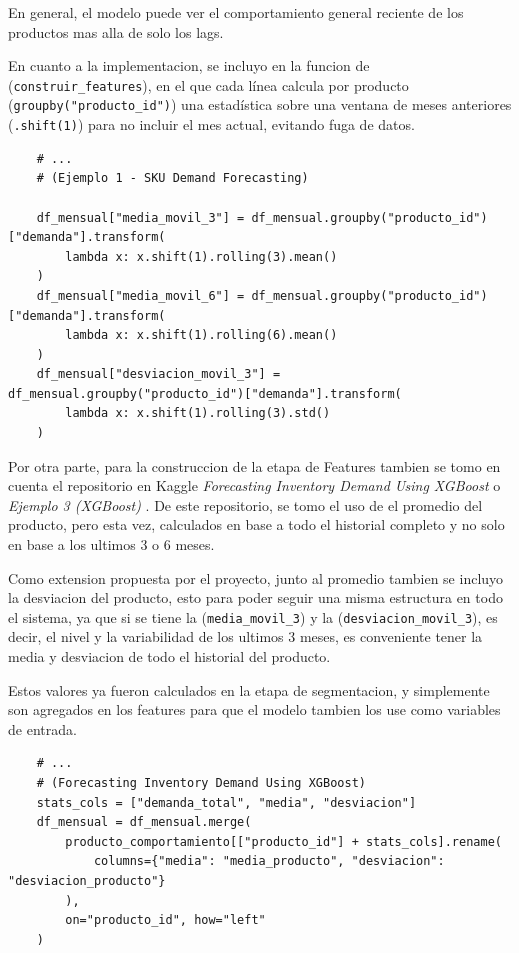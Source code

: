 En general, el modelo puede ver el comportamiento general reciente de los productos mas alla de solo los lags.

En cuanto a la implementacion, se incluyo en la funcion de (\texttt{construir\_features}), en el que cada línea calcula por producto (\texttt{groupby("producto\_id")}) una estadística sobre una ventana de meses anteriores (\texttt{.shift(1)}) para no incluir el mes actual, evitando fuga de datos.


\begin{verbatim}
    # ...
    # (Ejemplo 1 - SKU Demand Forecasting)

    df_mensual["media_movil_3"] = df_mensual.groupby("producto_id")["demanda"].transform(
        lambda x: x.shift(1).rolling(3).mean()
    )
    df_mensual["media_movil_6"] = df_mensual.groupby("producto_id")["demanda"].transform(
        lambda x: x.shift(1).rolling(6).mean()
    )
    df_mensual["desviacion_movil_3"] = df_mensual.groupby("producto_id")["demanda"].transform(
        lambda x: x.shift(1).rolling(3).std()
    )
\end{verbatim}

Por otra parte, para la construccion de la etapa de Features tambien se tomo en cuenta el repositorio en Kaggle \textit{Forecasting Inventory Demand Using XGBoost} \cite{ejemplo3_ksmooi_inventorydemand} o \textit{Ejemplo 3 (XGBoost)} \cite{ejemplo3_ksmooi_inventorydemand}. De este repositorio, se tomo el uso de el promedio del producto, pero esta vez, calculados en base a todo el historial completo y no solo en base a los ultimos 3 o 6 meses. 

Como extension propuesta por el proyecto, junto al promedio tambien se incluyo la desviacion del producto, esto para poder seguir una misma estructura en todo el sistema, ya que si se tiene la (\texttt{media\_movil\_3}) y la (\texttt{desviacion\_movil\_3}), es decir, el nivel y la variabilidad de los ultimos 3 meses, es conveniente tener la media y desviacion de todo el historial del producto.

Estos valores ya fueron calculados en la etapa de segmentacion, y simplemente son agregados en los features para que el modelo tambien los use como variables de entrada.

\begin{verbatim}
    # ...
    # (Forecasting Inventory Demand Using XGBoost)
    stats_cols = ["demanda_total", "media", "desviacion"]
    df_mensual = df_mensual.merge(
        producto_comportamiento[["producto_id"] + stats_cols].rename(
            columns={"media": "media_producto", "desviacion": "desviacion_producto"}
        ),
        on="producto_id", how="left"
    )
\end{verbatim}

